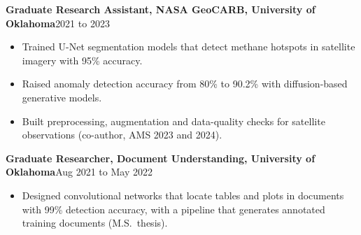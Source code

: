 \documentclass[11pt,letterpaper]{article}
\newcommand{\entry}[2]{\textbf{#1}\hfill #2\par}
\begin{document}
\entry{Graduate Research Assistant, NASA GeoCARB, University of Oklahoma}{2021 to 2023}
\begin{itemize}
  \item Trained U-Net segmentation models that detect methane hotspots in satellite imagery with 95\% accuracy.
  \item Raised anomaly detection accuracy from 80\% to 90.2\% with diffusion-based generative models.
  \item Built preprocessing, augmentation and data-quality checks for satellite observations (co-author, AMS 2023
    and 2024).
\end{itemize}
\smallskip

\entry{Graduate Researcher, Document Understanding, University of Oklahoma}{Aug 2021 to May 2022}
\begin{itemize}
  \item Designed convolutional networks that locate tables and plots in documents with 99\% detection accuracy,
    with a pipeline that generates annotated training documents (M.S.\ thesis).
\end{itemize}
\end{document}
